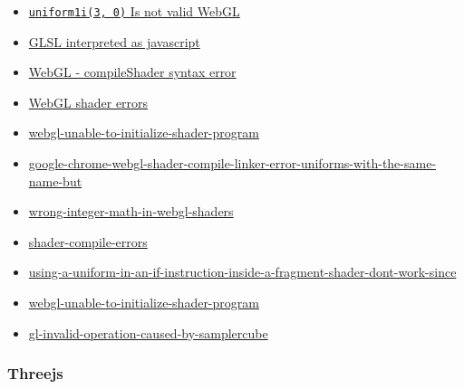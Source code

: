 \begin{itemize}
\tightlist
\item
  \href{http://stackoverflow.com/questions/20821486/how-to-debug-webgl-uncaught-type-error}{\texttt{uniform1i(3,\ 0)}
  Is not valid WebGL}
\item
  \href{http://stackoverflow.com/questions/31690465/webgl-shaders-uncaught-syntax-error}{GLSL
  interpreted as javascript}
\item
  \href{http://stackoverflow.com/questions/18500831/webgl-compileshader-syntax-error}{WebGL
  - compileShader syntax error}
\item
  \href{http://stackoverflow.com/questions/11216912/webgl-shader-errors}{WebGL
  shader errors}
\item
  \href{http://stackoverflow.com/questions/23724507/webgl-unable-to-initialize-shader-program}{webgl-unable-to-initialize-shader-program}
\item
  \href{http://stackoverflow.com/questions/20084865/google-chrome-webgl-shader-compile-linker-error-uniforms-with-the-same-name-but}{google-chrome-webgl-shader-compile-linker-error-uniforms-with-the-same-name-but}
\item
  \href{http://stackoverflow.com/questions/31520908/wrong-integer-math-in-webgl-shaders}{wrong-integer-math-in-webgl-shaders}
\item
  \href{http://stackoverflow.com/questions/12755044/shader-compile-errors}{shader-compile-errors}
\item
  \href{http://stackoverflow.com/questions/18815502/using-a-uniform-in-an-if-instruction-inside-a-fragment-shader-dont-work-since}{using-a-uniform-in-an-if-instruction-inside-a-fragment-shader-dont-work-since}
\item
  \href{http://stackoverflow.com/questions/23724507/webgl-unable-to-initialize-shader-program/23740067\#23740067}{webgl-unable-to-initialize-shader-program}
\item
  \href{http://stackoverflow.com/questions/31665132/gl-invalid-operation-caused-by-samplercube}{gl-invalid-operation-caused-by-samplercube}
\end{itemize}

\subsubsection{Threejs}\label{threejs}

